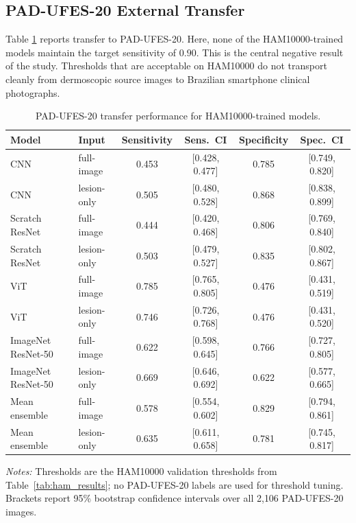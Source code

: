 \documentclass[10pt]{article}
\begin{document}
\subsection{PAD-UFES-20 External Transfer}

Table \ref{tab:pad_transfer} reports transfer to PAD-UFES-20. Here, none of the HAM10000-trained models maintain the target sensitivity of $0.90$. This is the central negative result of the study. Thresholds that are acceptable on HAM10000 do not transport cleanly from dermoscopic source images to Brazilian smartphone clinical photographs.

\begin{table}[t]
    \centering
    \begin{threeparttable}
    \caption{PAD-UFES-20 transfer performance for HAM10000-trained models.}
    \label{tab:pad_transfer}
    \footnotesize
    \begin{tabular}{llcccc}
        \toprule
        Model & Input & Sensitivity & Sens.\ CI & Specificity & Spec.\ CI \\
        \midrule
        CNN & full-image & 0.453 & [0.428, 0.477] & 0.785 & [0.749, 0.820] \\
        CNN & lesion-only & 0.505 & [0.480, 0.528] & 0.868 & [0.838, 0.899] \\
        Scratch ResNet & full-image & 0.444 & [0.420, 0.468] & 0.806 & [0.769, 0.840] \\
        Scratch ResNet & lesion-only & 0.503 & [0.479, 0.527] & 0.835 & [0.802, 0.867] \\
        ViT & full-image & 0.785 & [0.765, 0.805] & 0.476 & [0.431, 0.519] \\
        ViT & lesion-only & 0.746 & [0.726, 0.768] & 0.476 & [0.431, 0.520] \\
        ImageNet ResNet-50 & full-image & 0.622 & [0.598, 0.645] & 0.766 & [0.727, 0.805] \\
        ImageNet ResNet-50 & lesion-only & 0.669 & [0.646, 0.692] & 0.622 & [0.577, 0.665] \\
        Mean ensemble & full-image & 0.578 & [0.554, 0.602] & 0.829 & [0.794, 0.861] \\
        Mean ensemble & lesion-only & 0.635 & [0.611, 0.658] & 0.781 & [0.745, 0.817] \\
        \bottomrule
    \end{tabular}
    \begin{tablenotes}[para]
        \footnotesize
        \item \emph{Notes:} Thresholds are the HAM10000 validation thresholds from Table~\ref{tab:ham_results}; no PAD-UFES-20 labels are used for threshold tuning. Brackets report 95\% bootstrap confidence intervals over all 2{,}106 PAD-UFES-20 images.
    \end{tablenotes}
    \end{threeparttable}
\end{table}
\end{document}
